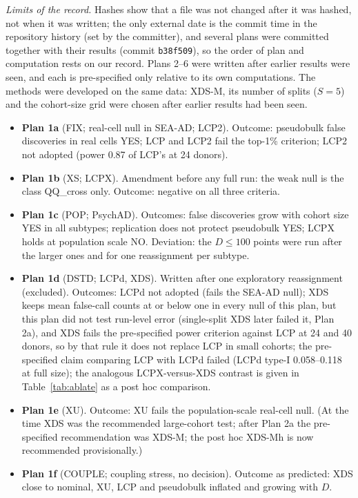 \emph{Limits of the record.} Hashes show that a file was not changed after it was hashed, not when it was written; the only external date is the commit time in the repository history (set by the committer), and several plans were committed together with their results (commit \texttt{b38f509}), so the order of plan and computation rests on our record. Plans 2--6 were written after earlier results were seen, and each is pre-specified only relative to its own computations. The methods were developed on the same data: XDS-M, its number of splits ($S=5$) and the cohort-size grid were chosen after earlier results had been seen.
\begin{itemize}\itemsep0pt
\item \textbf{Plan 1a} (FIX; real-cell null in SEA-AD; LCP2). Outcome: pseudobulk false discoveries in real cells YES; LCP and LCP2 fail the top-1\% criterion; LCP2 not adopted (power 0.87 of LCP's at 24 donors).
\item \textbf{Plan 1b} (XS; LCPX). Amendment before any full run: the weak null is the class QQ\_cross only. Outcome: negative on all three criteria.
\item \textbf{Plan 1c} (POP; PsychAD). Outcomes: false discoveries grow with cohort size YES in all subtypes; replication does not protect pseudobulk YES; LCPX holds at population scale NO. Deviation: the $D\le100$ points were run after the larger ones and for one reassignment per subtype.
\item \textbf{Plan 1d} (DSTD; LCPd, XDS). Written after one exploratory reassignment (excluded). Outcomes: LCPd not adopted (fails the SEA-AD null); XDS keeps mean false-call counts at or below one in every null of this plan, but this plan did not test run-level error (single-split XDS later failed it, Plan 2a), and XDS fails the pre-specified power criterion against LCP at 24 and 40 donors, so by that rule it does not replace LCP in small cohorts; the pre-specified claim comparing LCP with LCPd failed (LCPd type-I 0.058--0.118 at full size); the analogous LCPX-versus-XDS contrast is given in Table~\ref{tab:ablate} as a post hoc comparison.
\item \textbf{Plan 1e} (XU). Outcome: XU fails the population-scale real-cell null. (At the time XDS was the recommended large-cohort test; after Plan 2a the pre-specified recommendation was XDS-M; the post hoc XDS-Mh is now recommended provisionally.)
\item \textbf{Plan 1f} (COUPLE; coupling stress, no decision). Outcome as predicted: XDS close to nominal, XU, LCP and pseudobulk inflated and growing with $D$.

\end{itemize}
